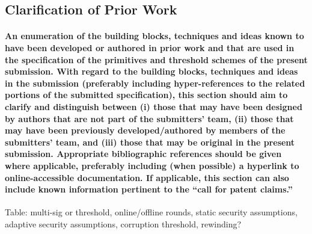 \subsection{Clarification of Prior Work}

\paragraph{An enumeration of the building blocks, techniques and ideas known to have been developed or authored in prior work and that are used in the specification of the primitives and threshold schemes of the present submission. With regard to the building blocks, techniques and ideas in the submission (preferably including hyper-references to the related portions of the submitted specification), this section should aim to clarify and distinguish between (i) those that may have been designed by authors that are not part of the submitters’ team, (ii) those that may have been previously developed/authored by members of the submitters’ team, and (iii) those that may be original in the present submission. Appropriate bibliographic references should be given where applicable, preferably including (when possible) a hyperlink to online-accessible documentation. If applicable, this section can also include known information pertinent to the “call for patent claims.”}




Table: multi-sig or threshold, online/offline rounds, static security assumptions, adaptive security assumptions, corruption threshold, rewinding?


